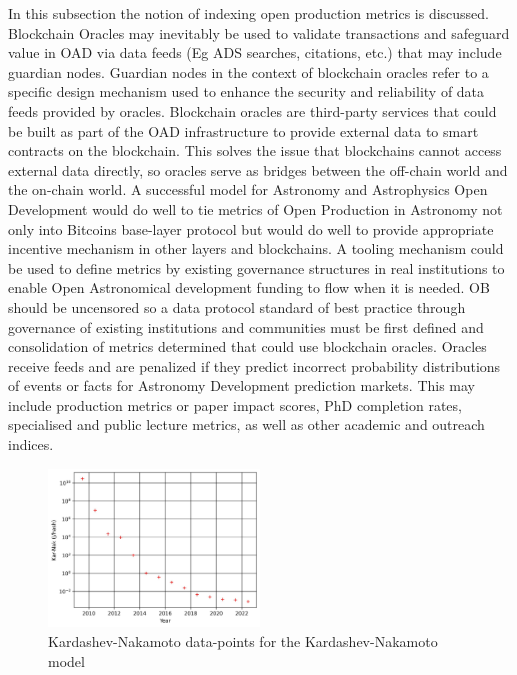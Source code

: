 \documentclass[final,5p,times,twocolumn,authoryear]{elsarticle}
\begin{document}
In this subsection the notion of indexing open production metrics is discussed.
Blockchain Oracles may inevitably be used to validate transactions and safeguard value in OAD via data feeds (Eg ADS searches, citations, etc.) that may include guardian nodes. Guardian nodes in the context of blockchain oracles refer to a specific design mechanism used to enhance the security and reliability of data feeds provided by oracles. Blockchain oracles are third-party services that could be built as part of the OAD infrastructure to provide external data to smart contracts on the blockchain. This solves the issue that blockchains cannot access external data directly, so oracles serve as bridges between the off-chain world and the on-chain world.
A successful model for Astronomy and Astrophysics Open Development would do well to tie metrics of Open Production in Astronomy not only into Bitcoins base-layer protocol but would do well to provide appropriate incentive mechanism in other layers and blockchains. A tooling mechanism could be used to define metrics by existing governance structures in real institutions to enable Open Astronomical development funding to flow when it is needed. OB should be uncensored so a data protocol standard of best practice through governance of existing institutions and communities must be first defined and consolidation of metrics determined that could use blockchain oracles. Oracles receive feeds and are penalized if they predict incorrect probability distributions of events or facts for Astronomy Development prediction markets. This may include production metrics or paper impact scores, PhD completion rates, specialised and public lecture metrics, as well as other academic and outreach indices.  

\begin{figure}
    \centering
    \includegraphics[width=0.50\textwidth]{figs/figkarnak.jpg}
    \caption{Kardashev-Nakamoto data-points for the Kardashev-Nakamoto model}
    \label{fig:karnak}

\end{figure}
\end{document}
